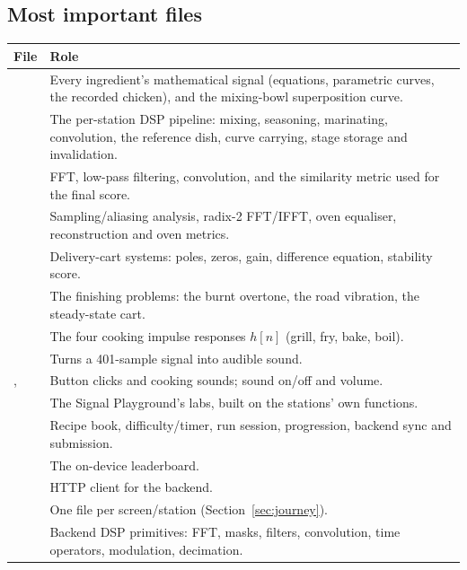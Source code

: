 \documentclass[11pt,a4paper]{article}
\begin{document}
\subsection{Most important files}
\begin{longtable}{@{}P{6.1cm}P{9.4cm}@{}}
\toprule
File & Role \\
\midrule
\endhead
{} & Every ingredient's mathematical signal (equations, parametric curves, the recorded chicken), and the mixing-bowl superposition curve. \\
 & The per-station DSP pipeline: mixing, seasoning, marinating, convolution, the reference dish, curve carrying, stage storage and invalidation. \\
 & FFT, low-pass filtering, convolution, and the similarity metric used for the final score. \\
 & Sampling/aliasing analysis, radix-2 FFT/IFFT, oven equaliser, reconstruction and oven metrics. \\
 & Delivery-cart systems: poles, zeros, gain, difference equation, stability score. \\
 & The finishing problems: the burnt overtone, the road vibration, the steady-state cart. \\
 & The four cooking impulse responses $h[n]$ (grill, fry, bake, boil). \\
 & Turns a 401-sample signal into audible sound. \\
,  & Button clicks and cooking sounds; sound on/off and volume. \\
 & The Signal Playground's labs, built on the stations' own functions. \\
 & Recipe book, difficulty/timer, run session, progression, backend sync and submission. \\
 & The on-device leaderboard. \\
 & HTTP client for the backend. \\
 & One file per screen/station (Section~\ref{sec:journey}). \\
 & Backend DSP primitives: FFT, masks, filters, convolution, time operators, modulation, decimation. \\

\end{longtable}
\end{document}
